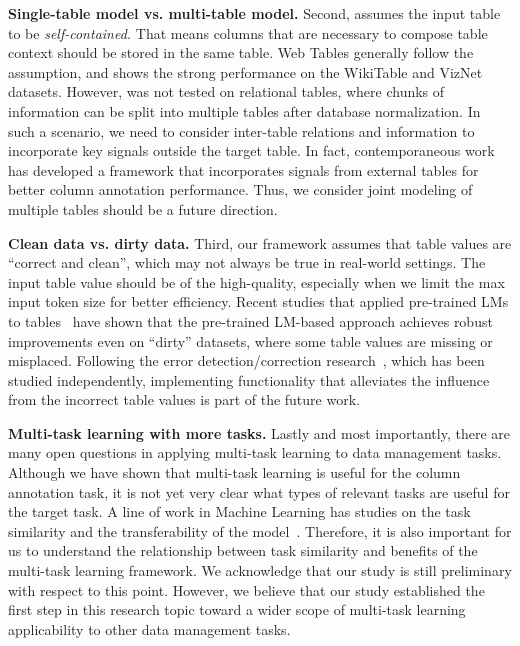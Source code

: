 \noindent
{\bf Single-table model vs. multi-table model.}
Second, \name{} assumes the input table to be {\em self-contained.} That means columns that are necessary to compose table context should be stored in the same table.
%
Web Tables generally follow the assumption, and \name{} shows the strong performance on the WikiTable and VizNet datasets.
%
However, \name{} was not tested on relational tables, where chunks of information can be split into multiple tables after database normalization.
%
In such a scenario, we need to consider inter-table relations and information to incorporate key signals outside the target table.
%
In fact, contemporaneous work~\cite{Wang:2021:TCN} has developed a framework that incorporates signals from external tables for better column annotation performance.
%
Thus, we consider joint modeling of multiple tables should be a future direction.


\noindent
{\bf Clean data vs. dirty data.}
Third, our framework assumes that table values are ``correct and clean'', which may not always be true in real-world settings.
%
The input table value should be of the high-quality, especially when we limit the max input token size for better efficiency.
%
Recent studies that applied pre-trained LMs to tables~\cite{Li:2020:Ditto,Li:2021:JDIQ:DeepEntityMatching} have shown that the pre-trained LM-based approach achieves robust improvements even on ``dirty'' datasets, where some table values are missing or misplaced.
%
Following the error detection/correction research~\cite{Mahdavi:2019:Raha,Mahdavi:2020:Baran}, which has been studied independently, implementing functionality that alleviates the influence from the incorrect table values is part of the future work.


\noindent
{\bf Multi-task learning with more tasks.}
Lastly and most importantly, there are many open questions in applying multi-task learning to data management tasks. Although we have shown that multi-task learning is useful for the column annotation task, it is not yet very clear what types of relevant tasks are useful for the target task.
%
A line of work in Machine Learning has studies on the task similarity and the transferability of the model~\cite{Taskonomy2018}.
%
Therefore, it is also important for us to understand the relationship between task similarity and benefits of the multi-task learning framework.
%
We acknowledge that our study is still preliminary with respect to this point. However, we believe that our study established the first step in this research topic toward a wider scope of multi-task learning applicability to other data management tasks.


